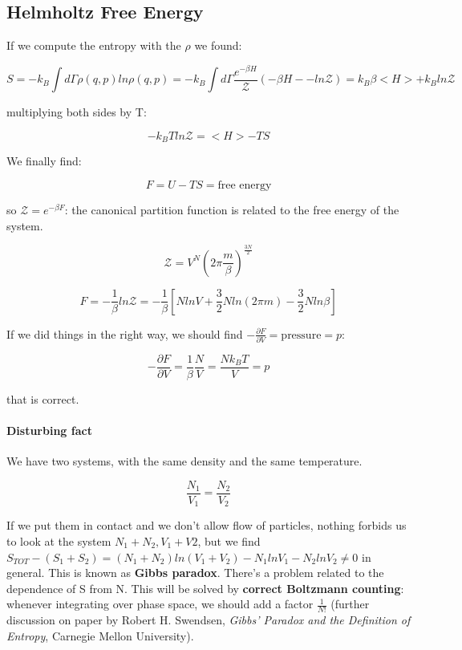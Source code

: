 \documentclass[a4paper, italian, openany]{book}
\begin{document}
\subsection{Helmholtz Free Energy}

If we compute the entropy with the $\rho$ we found:

$$S = -k_B \int d\Gamma \rho(q, p) ln \rho(q, p) = -k_B \int d\Gamma \frac{e^{-\beta H}}{\mathcal{Z}} (-\beta H --ln \mathcal{Z}) = k_B \beta <H> + k_B ln \mathcal{Z}$$

multiplying both sides by T:

$$- k_B T ln \mathcal{Z} = <H> - TS$$

We finally find:

$$F = U - TS = \mbox{free energy}$$

so $\mathcal{Z} = e^{-\beta F}$: the canonical partition function is related to the free energy of the system.

$$\mathcal{Z} = V^N \left ( 2\pi \frac{m}{\beta} \right )^{\frac{3N}{2}}$$

$$F = -\frac{1}{\beta}ln \mathcal{Z} =  -\frac{1}{\beta} \left [ N ln V + \frac{3}{2} N ln(2\pi m) - \frac{3}{2} N ln \beta \right ]$$

If we did things in the right way, we should find $- \frac{\partial F}{\partial V} = \mbox{pressure} = p$:

$$- \frac{\partial F}{\partial V} = \frac{1}{\beta} \frac{N}{V} = \frac{N k_B T}{V} = p$$

that is correct.

\paragraph{Disturbing fact}

We have two systems, with the same density and the same temperature.

$$\frac{N_1}{V_1} = \frac{N_2}{V_2}$$

If we put them in contact and we don't allow flow of particles, nothing forbids us to look at the system $N_1 + N_2, V_1 + V2$, but we find $S_{TOT} - (S_1 + S_2) = (N_1 + N_2) ln(V_1 + V_2) - N_1 ln V_1 - N_2 ln V_2 \ne 0$ in general. This is known as \textbf{Gibbs paradox}. There's a problem related to the dependence of S from N. This will be solved by \textbf{correct Boltzmann counting}: whenever integrating over phase space, we should add a factor $\frac{1}{N!}$ (further discussion on paper by Robert H. Swendsen, \textit{Gibbs' Paradox and the Definition of Entropy}, Carnegie Mellon University).
\end{document}
